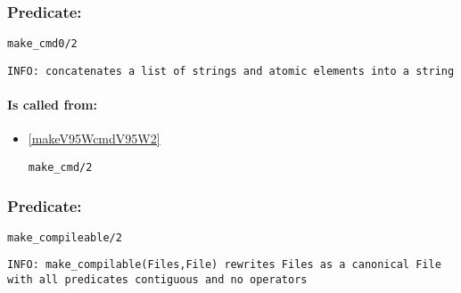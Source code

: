 \subsubsection{Predicate:} \label{makeV95Wcmd0V95W2}

\begin{verbatim}
make_cmd0/2
\end{verbatim}

{\small \begin{verbatim}
INFO: concatenates a list of strings and atomic elements into a string

\end{verbatim}}
\paragraph{Is called from:} 
\begin{itemize}
\item \ref{makeV95WcmdV95W2} 
\begin{verbatim}
make_cmd/2
\end{verbatim}

\end{itemize}

\subsubsection{Predicate:} \label{makeV95WcompileableV95W2}

\begin{verbatim}
make_compileable/2
\end{verbatim}

{\small \begin{verbatim}
INFO: make_compilable(Files,File) rewrites Files as a canonical File with all predicates contiguous and no operators

\end{verbatim}}
